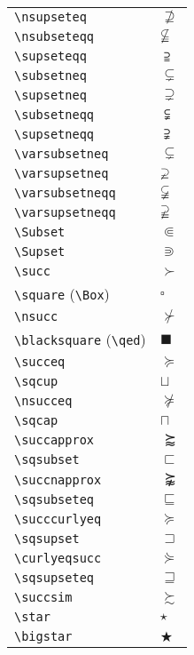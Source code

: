 \documentclass[text,xhtml,itex]{internet}
\begin{document}
\begin{tabular}{ll}
\verb+\nsupseteq+ & \(\nsupseteq\) \\
\verb+\nsubseteqq+ & \(\nsubseteqq\)       \\
\verb+\supseteqq+ & \(\supseteqq\) \\
\verb+\subsetneq+             & \(\subsetneq\) \\
\verb+\supsetneq+ & \(\supsetneq\) \\
\verb+\subsetneqq+ & \(\subsetneqq\)       \\
\verb+\supsetneqq+ & \(\supsetneqq\) \\
\verb+\varsubsetneq+          & \(\varsubsetneq\) \\
\verb+\varsupsetneq+ & \(\varsupsetneq\) \\
\verb+\varsubsetneqq+ & \(\varsubsetneqq\)    \\
\verb+\varsupsetneqq+ & \(\varsupsetneqq\) \\
\verb+\Subset+                & \(\Subset\) \\
\verb+\Supset+ & \(\Supset\) \\
\verb+\succ+ & \(\succ\)             \\
\verb+\square+ (\verb+\Box+) & \(\square\) \\
\verb+\nsucc+                 & \(\nsucc\) \\
\verb+\blacksquare+ (\verb+\qed+) & \(\blacksquare\) \\
\verb+\succeq+ & \(\succeq\)           \\
\verb+\sqcup+ & \(\sqcup\) \\
\verb+\nsucceq+               & \(\nsucceq\) \\
\verb+\sqcap+ & \(\sqcap\) \\
\verb+\succapprox+ & \(\succapprox\)       \\
\verb+\sqsubset+ & \(\sqsubset\) \\
\verb+\succnapprox+           & \(\succnapprox\) \\
\verb+\sqsubseteq+ & \(\sqsubseteq\) \\
\verb+\succcurlyeq+ & \(\succcurlyeq\)      \\
\verb+\sqsupset+ & \(\sqsupset\) \\
\verb+\curlyeqsucc+           & \(\curlyeqsucc\) \\
\verb+\sqsupseteq+ & \(\sqsupseteq\) \\
\verb+\succsim+ & \(\succsim\)          \\
\verb+\star+ & \(\star\) \\
\verb+\bigstar+               & \(\bigstar\) \\

\end{tabular}
\end{document}
